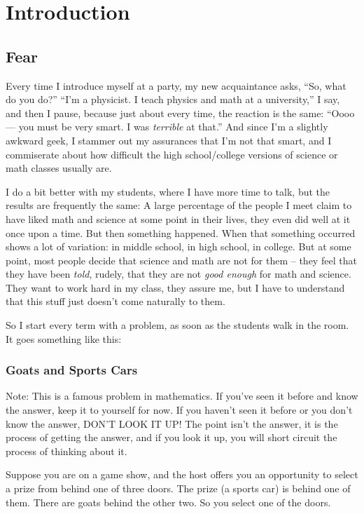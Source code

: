 \chapter{Introduction}

\section{Fear}

Every time I introduce myself at a party, my new acquaintance asks,
``So, what do you do?''  ``I'm a physicist. I teach physics and math
at a university,'' I say, and then I pause, because just about every
time, the reaction is the same: ``Oooo --- you must be very smart.  I
was \emph{terrible} at that.''  And since I'm a slightly awkward geek,
I stammer out my assurances that I'm not that smart, and I
commiserate about how difficult the high school/college versions of
science or math classes usually are. 


I do a bit better with my students, where I have more time to talk,
but the results are frequently the same: A large percentage of the
people I meet claim to have liked math and science at some point in
their lives, they even did well at it once upon a time.  But then
something happened.  When that something occurred shows a lot of
variation: in middle school, in high school, in college.  But at some
point, most people decide that science and math are not for them --
they feel that they have been \emph{told}, rudely, that they are not
\emph{good enough} for math and science.  They want to work hard in my
class, they assure me, but I have to understand that this stuff just
doesn't come naturally to them.


So I start every term with a problem, as soon as the students walk in
the room.  It goes something like this:

\subsection{Goats and Sports Cars}
Note: This is a famous problem in mathematics.  If you've seen it
before and know the answer, keep it to yourself for now.  If you
haven't seen it before or you don't know the answer, DON'T LOOK IT UP!
The point isn't the answer, it is the process of getting the answer,
and if you look it up, you will short circuit the process of thinking
about it.

Suppose you are on a game show, and the host offers you an opportunity
to select a prize from behind one of three doors.  The prize (a sports
car) is behind one of them.  There are goats behind the other two.  So
you select one of the doors.

